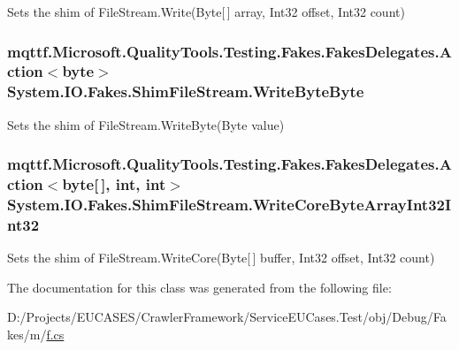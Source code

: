 Sets the shim of File\-Stream.\-Write(\-Byte\mbox{[}$\,$\mbox{]} array, Int32 offset, Int32 count)

\hypertarget{class_system_1_1_i_o_1_1_fakes_1_1_shim_file_stream_a7a570ec99682947f57182afd631e3db0}{
\subsubsection[{Write\-Byte\-Byte}]{\setlength{\rightskip}{0pt plus 5cm}mqttf.\-Microsoft.\-Quality\-Tools.\-Testing.\-Fakes.\-Fakes\-Delegates.\-Action$<$byte$>$ System.\-I\-O.\-Fakes.\-Shim\-File\-Stream.\-Write\-Byte\-Byte\hspace{0.3cm}{\ttfamily [set]}}}\label{class_system_1_1_i_o_1_1_fakes_1_1_shim_file_stream_a7a570ec99682947f57182afd631e3db0}


Sets the shim of File\-Stream.\-Write\-Byte(\-Byte value)

\hypertarget{class_system_1_1_i_o_1_1_fakes_1_1_shim_file_stream_ac8f3d0948ed7e5373f84c5d16442520a}{
\subsubsection[{Write\-Core\-Byte\-Array\-Int32\-Int32}]{\setlength{\rightskip}{0pt plus 5cm}mqttf.\-Microsoft.\-Quality\-Tools.\-Testing.\-Fakes.\-Fakes\-Delegates.\-Action$<$byte\mbox{[}$\,$\mbox{]}, int, int$>$ System.\-I\-O.\-Fakes.\-Shim\-File\-Stream.\-Write\-Core\-Byte\-Array\-Int32\-Int32\hspace{0.3cm}{\ttfamily [set]}}}\label{class_system_1_1_i_o_1_1_fakes_1_1_shim_file_stream_ac8f3d0948ed7e5373f84c5d16442520a}


Sets the shim of File\-Stream.\-Write\-Core(\-Byte\mbox{[}$\,$\mbox{]} buffer, Int32 offset, Int32 count)



The documentation for this class was generated from the following file\-:\begin{DoxyCompactItemize}
\item 
D\-:/\-Projects/\-E\-U\-C\-A\-S\-E\-S/\-Crawler\-Framework/\-Service\-E\-U\-Cases.\-Test/obj/\-Debug/\-Fakes/m/\hyperlink{m_2f_8cs}{f.\-cs}\end{DoxyCompactItemize}
